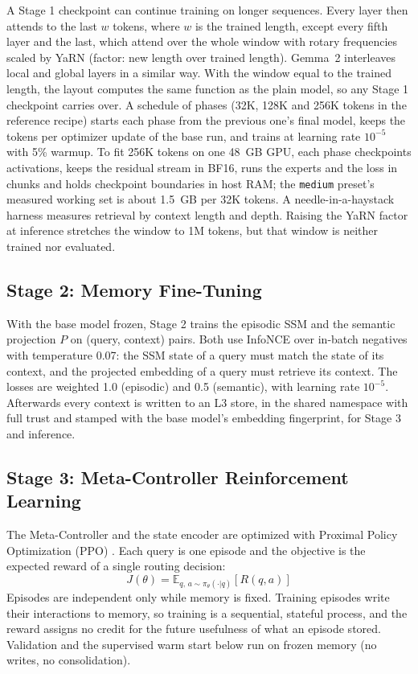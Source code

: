 \documentclass{article}
\begin{document}
A Stage 1 checkpoint can continue training on longer sequences. Every layer then attends to the last $w$ tokens, where $w$ is the trained length, except every fifth layer and the last, which attend over the whole window with rotary frequencies scaled by YaRN \cite{peng2023yarn} (factor: new length over trained length). Gemma~2 \cite{gemma2024gemma2} interleaves local and global layers in a similar way. With the window equal to the trained length, the layout computes the same function as the plain model, so any Stage 1 checkpoint carries over. A schedule of phases (32K, 128K and 256K tokens in the reference recipe) starts each phase from the previous one's final model, keeps the tokens per optimizer update of the base run, and trains at learning rate $10^{-5}$ with 5\% warmup. To fit 256K tokens on one 48~GB GPU, each phase checkpoints activations, keeps the residual stream in BF16, runs the experts and the loss in chunks and holds checkpoint boundaries in host RAM; the \texttt{medium} preset's measured working set is about 1.5~GB per 32K tokens. A needle-in-a-haystack harness measures retrieval by context length and depth. Raising the YaRN factor at inference stretches the window to 1M tokens, but that window is neither trained nor evaluated.

\subsection{Stage 2: Memory Fine-Tuning}

With the base model frozen, Stage 2 trains the episodic SSM and the semantic projection $P$ on (query, context) pairs. Both use InfoNCE over in-batch negatives with temperature 0.07: the SSM state of a query must match the state of its context, and the projected embedding of a query must retrieve its context. The losses are weighted 1.0 (episodic) and 0.5 (semantic), with learning rate $10^{-5}$. Afterwards every context is written to an L3 store, in the shared namespace with full trust and stamped with the base model's embedding fingerprint, for Stage 3 and inference.

\subsection{Stage 3: Meta-Controller Reinforcement Learning}

The Meta-Controller and the state encoder are optimized with Proximal Policy Optimization (PPO) \cite{schulman2017ppo}. Each query is one episode and the objective is the expected reward of a single routing decision:
\begin{equation}
J(\theta) = \mathbb{E}_{q,\, a \sim \pi_\theta(\cdot|q)} \left[ R(q, a) \right]
\end{equation}
Episodes are independent only while memory is fixed. Training episodes write their interactions to memory, so training is a sequential, stateful process, and the reward assigns no credit for the future usefulness of what an episode stored. Validation and the supervised warm start below run on frozen memory (no writes, no consolidation).
\end{document}
